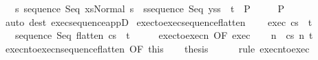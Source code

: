 \begin{isabellebody}
\ \ \ {\isasymAnd}s{\isacharprime}{\isachardot}\ {\isasymlbrakk}{\isasymGamma}{\isasymturnstile}{\isasymlangle}sequence\ Seq\ xs{\isacharcomma}Normal\ s{\isasymrangle}\ {\isasymRightarrow}\ s{\isacharprime}{\isacharsemicolon}{\isasymGamma}{\isasymturnstile}{\isasymlangle}sequence\ Seq\ ys{\isacharcomma}s{\isacharprime}{\isasymrangle}\ {\isasymRightarrow}\ t{\isasymrbrakk}\ {\isasymLongrightarrow}\ P\isanewline
\ \ \ {\isasymrbrakk}\ {\isasymLongrightarrow}\ P{\isachardoublequoteclose}\isanewline
%
\isadelimproof
\ \ %
\endisadelimproof
%
\isatagproof
{}\isamarkupfalse%
\ {\isacharparenleft}auto\ dest{\isacharcolon}\ exec{\isacharunderscore}sequence{\isacharunderscore}appD{\isacharparenright}%
\endisatagproof
{\isafoldproof}%
%
\isadelimproof
\isanewline
%
\endisadelimproof
\isanewline
{}\isamarkupfalse%
\ exec{\isacharunderscore}to{\isacharunderscore}exec{\isacharunderscore}sequence{\isacharunderscore}flatten{\isacharcolon}\ \isanewline
\ \ \ exec{\isacharcolon}\ {\isachardoublequoteopen}{\isasymGamma}{\isasymturnstile}{\isasymlangle}c{\isacharcomma}s{\isasymrangle}\ {\isasymRightarrow}\ t{\isachardoublequoteclose}\isanewline
\ \ \ {\isachardoublequoteopen}{\isasymGamma}{\isasymturnstile}{\isasymlangle}sequence\ Seq\ {\isacharparenleft}flatten\ c{\isacharparenright}{\isacharcomma}s{\isasymrangle}\ {\isasymRightarrow}\ t{\isachardoublequoteclose}\isanewline
%
\isadelimproof
%
\endisadelimproof
%
\isatagproof
{}\isamarkupfalse%
\ {\isacharminus}\isanewline
\ \ \isamarkupfalse%
\ exec{\isacharunderscore}to{\isacharunderscore}execn\ {\isacharbrackleft}OF\ exec{\isacharbrackright}\isanewline
\ \ \isamarkupfalse%
\ n\ \ {\isachardoublequoteopen}{\isasymGamma}{\isasymturnstile}{\isasymlangle}c{\isacharcomma}s{\isasymrangle}\ {\isacharequal}n{\isasymRightarrow}\ t{\isachardoublequoteclose}\isacommand{{\isachardot}{\isachardot}}\isamarkupfalse%
\isanewline
\ \ \isamarkupfalse%
\ execn{\isacharunderscore}to{\isacharunderscore}execn{\isacharunderscore}sequence{\isacharunderscore}flatten\ {\isacharbrackleft}OF\ this{\isacharbrackright}\isanewline
\ \ \isamarkupfalse%
\ {\isacharquery}thesis\isanewline
\ \ \ \ \isamarkupfalse%
\ {\isacharparenleft}rule\ execn{\isacharunderscore}to{\isacharunderscore}exec{\isacharparenright}\isanewline
{}\isamarkupfalse%
%
\endisatagproof
{\isafoldproof}%
%
\isadelimproof
\isanewline
%
\endisadelimproof
\isanewline
{}\isamarkupfalse%

\end{isabellebody}
